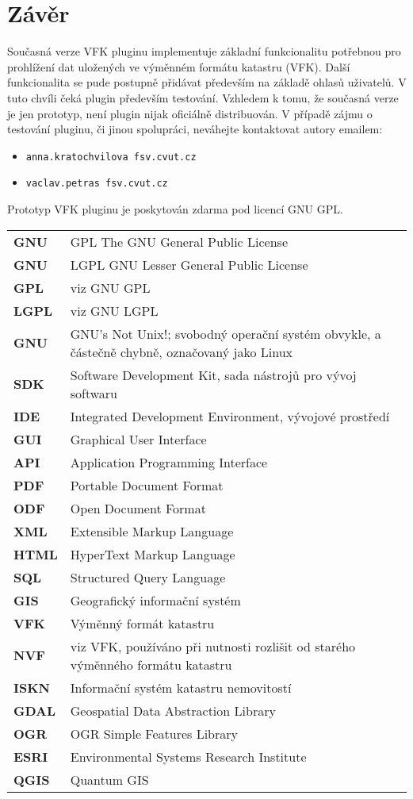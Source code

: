 \documentclass[a4paper,10pt]{article}
\newcommand{\radekZkr}[2]{\textbf{#1} & #2 \\}
\begin{document}
\section{Závěr}
Současná verze VFK pluginu implementuje základní funkcionalitu potřebnou pro prohlížení dat uložených ve výměnném formátu katastru (VFK).
Další funkcionalita se pude postupně přidávat především na základě ohlasů uživatelů.
V tuto chvíli čeká plugin především testování.
Vzhledem k tomu, že současná verze je jen prototyp, není plugin nijak oficiálně distribuován.
V případě zájmu o testování pluginu, či jinou spolupráci, neváhejte kontaktovat autory emailem:
    \begin{itemize}
    \item \verb|anna.kratochvilova fsv.cvut.cz|
    \item \verb|vaclav.petras fsv.cvut.cz|
    \end{itemize}
    
Prototyp VFK pluginu je poskytován zdarma pod licencí GNU GPL.

\newpage
\begin{tabular}{lp{10cm}}

\radekZkr{GNU}{GPL The GNU General Public License}
\radekZkr{GNU}{LGPL GNU Lesser General Public License}
\radekZkr{GPL}{viz GNU GPL}
\radekZkr{LGPL}{viz GNU LGPL}
\radekZkr{GNU}{GNU's Not Unix!; svobodný operační systém obvykle, a částečně chybně, označovaný jako Linux}

\radekZkr{SDK}{Software Development Kit, sada nástrojů pro vývoj softwaru}
\radekZkr{IDE}{Integrated Development Environment, vývojové prostředí}
\radekZkr{GUI}{Graphical User Interface}
\radekZkr{API}{Application Programming Interface}

\radekZkr{PDF}{Portable Document Format}
\radekZkr{ODF}{Open Document Format}
\radekZkr{XML}{Extensible Markup Language}
\radekZkr{HTML}{HyperText Markup Language}
\radekZkr{SQL}{Structured Query Language}

\radekZkr{GIS}{Geografický informační systém}

\radekZkr{VFK}{Výměnný formát katastru}
\radekZkr{NVF}{viz VFK, používáno při nutnosti rozlišit od starého výměnného formátu katastru}
\radekZkr{ISKN}{Informační systém katastru nemovitostí}

\radekZkr{GDAL}{Geospatial Data Abstraction Library}
\radekZkr{OGR}{OGR Simple Features Library}
\radekZkr{ESRI}{Environmental Systems Research Institute}
\radekZkr{QGIS}{Quantum GIS}

\end{tabular}
\end{document}
